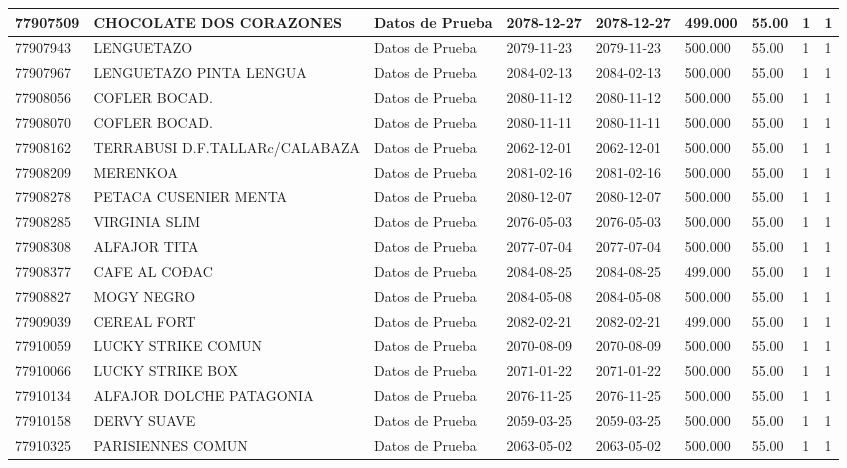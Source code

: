 \documentclass[a4paper,12pt]{article}
\begin{document}
\begin{landscape}
\begin{longtable}{|p{4cm}|p{2.5cm}|p{2.5cm}|p{1.8cm}|p{1.8cm}|p{1cm}|p{1cm}|p{3cm}|p{3cm}||}
77907509 & CHOCOLATE DOS CORAZONES & Datos de Prueba & 2078-12-27 & 2078-12-27 & 499.000 & 55.00 & 1 & 1 \\ \hline 
77907943 & LENGUETAZO & Datos de Prueba & 2079-11-23 & 2079-11-23 & 500.000 & 55.00 & 1 & 1 \\ \hline 
77907967 & LENGUETAZO PINTA LENGUA & Datos de Prueba & 2084-02-13 & 2084-02-13 & 500.000 & 55.00 & 1 & 1 \\ \hline 
77908056 & COFLER BOCAD. & Datos de Prueba & 2080-11-12 & 2080-11-12 & 500.000 & 55.00 & 1 & 1 \\ \hline 
77908070 & COFLER BOCAD. & Datos de Prueba & 2080-11-11 & 2080-11-11 & 500.000 & 55.00 & 1 & 1 \\ \hline 
77908162 & TERRABUSI D.F.TALLARc/CALABAZA & Datos de Prueba & 2062-12-01 & 2062-12-01 & 500.000 & 55.00 & 1 & 1 \\ \hline 
77908209 & MERENKOA & Datos de Prueba & 2081-02-16 & 2081-02-16 & 500.000 & 55.00 & 1 & 1 \\ \hline 
77908278 & PETACA CUSENIER MENTA & Datos de Prueba & 2080-12-07 & 2080-12-07 & 500.000 & 55.00 & 1 & 1 \\ \hline 
77908285 & VIRGINIA SLIM & Datos de Prueba & 2076-05-03 & 2076-05-03 & 500.000 & 55.00 & 1 & 1 \\ \hline 
77908308 & ALFAJOR TITA & Datos de Prueba & 2077-07-04 & 2077-07-04 & 500.000 & 55.00 & 1 & 1 \\ \hline 
77908377 & CAFE AL COÐAC & Datos de Prueba & 2084-08-25 & 2084-08-25 & 499.000 & 55.00 & 1 & 1 \\ \hline 
77908827 & MOGY NEGRO & Datos de Prueba & 2084-05-08 & 2084-05-08 & 500.000 & 55.00 & 1 & 1 \\ \hline 
77909039 & CEREAL FORT & Datos de Prueba & 2082-02-21 & 2082-02-21 & 499.000 & 55.00 & 1 & 1 \\ \hline 
77910059 & LUCKY STRIKE COMUN & Datos de Prueba & 2070-08-09 & 2070-08-09 & 500.000 & 55.00 & 1 & 1 \\ \hline 
77910066 & LUCKY STRIKE BOX & Datos de Prueba & 2071-01-22 & 2071-01-22 & 500.000 & 55.00 & 1 & 1 \\ \hline 
77910134 & ALFAJOR DOLCHE PATAGONIA & Datos de Prueba & 2076-11-25 & 2076-11-25 & 500.000 & 55.00 & 1 & 1 \\ \hline 
77910158 & DERVY SUAVE & Datos de Prueba & 2059-03-25 & 2059-03-25 & 500.000 & 55.00 & 1 & 1 \\ \hline 
77910325 & PARISIENNES COMUN & Datos de Prueba & 2063-05-02 & 2063-05-02 & 500.000 & 55.00 & 1 & 1 \\ \hline 

\end{longtable}
\end{landscape}
\end{document}
